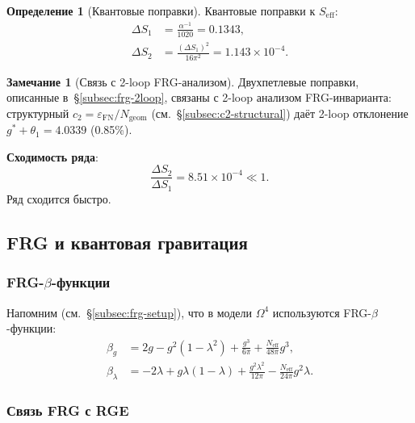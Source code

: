 \documentclass[11pt,a4paper]{article}
\newcommand{\Om}{\ensuremath{\Omega^4}}
\newcommand{\epsFN}{\ensuremath{\varepsilon_{\text{FN}}}}
\theoremstyle{definition}
\newtheorem{definition}[theorem]{Определение}
\newtheorem{remark}[theorem]{Замечание}
\begin{document}
\begin{definition}[Квантовые поправки]
\label{def:qg-2loop}
Квантовые поправки к $S_{\text{eff}}$:
\begin{align}
    \Delta S_1 &= \frac{\alpha^{-1}}{1020} = 0.1343, \\
    \Delta S_2 &= \frac{(\Delta S_1)^2}{16\pi^2} = 1.143 \times 10^{-4}.
\end{align}
\end{definition}

\begin{remark}[Связь с 2-loop FRG-анализом]
\label{rem:2loop-link}
Двухпетлевые поправки, описанные в~\S\ref{subsec:frg-2loop},
связаны с 2-loop анализом FRG-инварианта: структурный
$c_2 = \epsFN/N_{\text{geom}}$ (см.~\S\ref{subsec:c2-structural})
даёт 2-loop отклонение $g^* + \theta_1 = 4.0339$ (0.85\%).
\end{remark}

\medskip\noindent
\textbf{Сходимость ряда}:
\begin{equation}
    \frac{\Delta S_2}{\Delta S_1} = 8.51 \times 10^{-4} \ll 1.
\end{equation}
Ряд сходится быстро.

\subsection{FRG и квантовая гравитация}
\label{subsec:qg-frg}

\subsubsection{FRG-\texorpdfstring{$\beta$}{}-функции}

Напомним (см.~\S\ref{subsec:frg-setup}), что в модели $\Om$
используются FRG-$\beta$-функции:
\begin{align}
    \beta_g &= 2g - g^2(1 - \lambda^2) + \frac{g^3}{6\pi}
    + \frac{N_{\text{eff}}}{48\pi} g^3, \\
    \beta_\lambda &= -2\lambda + g\lambda(1-\lambda)
    + \frac{g^2 \lambda^2}{12\pi}
    - \frac{N_{\text{eff}}}{24\pi} g^2 \lambda.
\end{align}

\subsubsection{Связь FRG с RGE}
\end{document}
